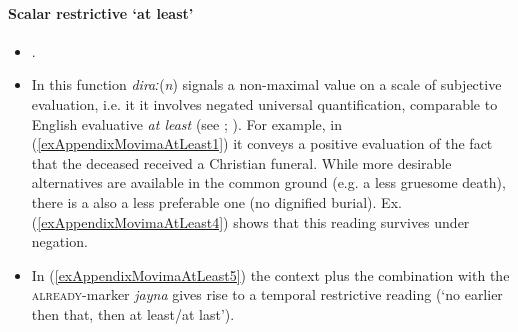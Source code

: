 \paragraph{Scalar restrictive \lq at least'}
\label{appendixMovimaAtLeast}
\begin{itemize}
	\item \textcite[521]{Haude2006}.
	\item In this function \mbox{\textit{diraː}(\textit{n})} signals a non-maximal value on a scale of subjective evaluation, i.e. it it involves negated universal quantification, comparable to English evaluative \textit{at least} (see \cite{Kay1992}; \cite{Gast2012}). For example, in (\ref{exAppendixMovimaAtLeast1}) it conveys a positive evaluation of the fact that the deceased received a Christian funeral. While more desirable alternatives are available in the common ground (e.g. a less gruesome death), there is a also a less preferable one (no dignified burial). Ex. (\ref{exAppendixMovimaAtLeast4}) shows that this reading survives under negation.	
	\item In (\ref{exAppendixMovimaAtLeast5}) the context plus the combination with the \textsc{already}-marker \textit{jayna} gives rise to a temporal restrictive reading (\lq no earlier then that, then at least/at last'). 
\end{itemize}
\largerpage

